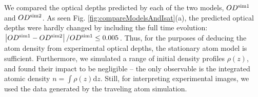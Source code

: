\par We compared the optical depths predicted by each of the two models, $OD^{\rm{sim1}}$ and $OD^{\rm{sim2}}$. As seen Fig. \ref{fig:compareModelsAndIsat}(a), the predicted optical depths were hardly changed by including the full time evolution:  $\left|OD^{\rm{sim1}}-OD^{\rm{sim2}}\right|/OD^{\rm{sim1}} \le 0.005$. Thus, for the purposes of deducing the atom density from experimental optical depths, the stationary atom model is sufficient. Furthermore, we simulated a range of initial density profiles $\rho(z)$, and found their impact to be negligible \--- the only observable is the integrated atomic density $n=\int\rho(z)\mathrm{d}z$. Still, for interpreting experimental images, we used the data generated by the traveling atom simulation.
\begin{figure}

\end{figure}
